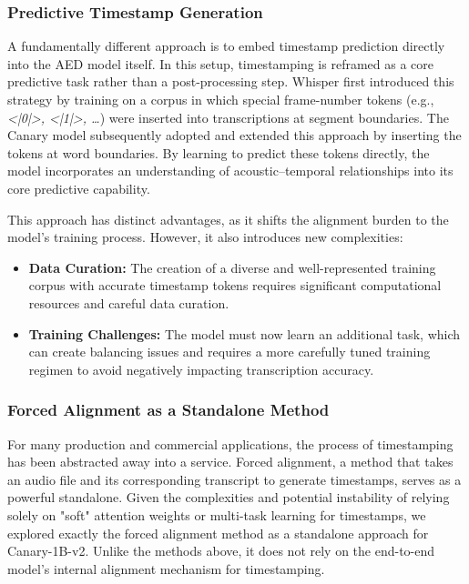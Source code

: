 \subsubsection{Predictive Timestamp Generation}

A fundamentally different approach is to embed timestamp prediction directly into the AED model itself. In this setup, timestamping is reframed as a core predictive task rather than a post-processing step. Whisper \cite{radford2023whisper} first introduced this strategy by training on a corpus in which special frame-number tokens (e.g., \emph{<|0|>, <|1|>, …}) were inserted into transcriptions at segment boundaries. The Canary model \cite{canary1b-flash-timestamps} subsequently adopted and extended this approach by inserting the tokens at word boundaries. By learning to predict these tokens directly, the model incorporates an understanding of acoustic–temporal relationships into its core predictive capability.

This approach has distinct advantages, as it shifts the alignment burden to the model's training process. However, it also introduces new complexities:

\begin{itemize}
    \item \textbf{Data Curation:} The creation of a diverse and well-represented training corpus with accurate timestamp tokens requires significant computational resources and careful data curation.
    \item \textbf{Training Challenges:} The model must now learn an additional task, which can create balancing issues and requires a more carefully tuned training regimen to avoid negatively impacting transcription accuracy.
\end{itemize}


\subsubsection{Forced Alignment as a Standalone Method}

For many production and commercial applications\cite{whisperX}, the process of timestamping has been abstracted away into a service. Forced alignment, a method that takes an audio file and its corresponding transcript to generate timestamps, serves as a powerful standalone. 
Given the complexities and potential instability of relying solely on "soft" attention weights or multi-task learning for timestamps, we explored exactly the forced alignment method as a standalone approach for Canary-1B-v2. Unlike the methods above, it does not rely on the end-to-end model's internal alignment mechanism for timestamping.

